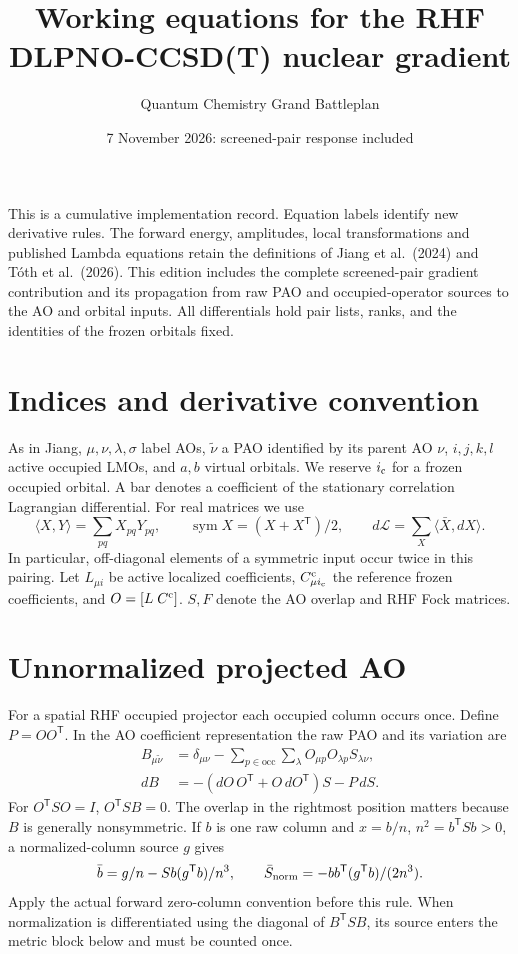 \documentclass[11pt]{article}
\title{Working equations for the RHF DLPNO-CCSD(T) nuclear gradient}
\author{Quantum Chemistry Grand Battleplan}
\date{7 November 2026: screened-pair response included}
\newcommand{\T}{^{\mathsf T}}
\newcommand{\sym}{\operatorname{sym}}
\newcommand{\ip}[2]{\langle #1,#2\rangle}
\begin{document}
\maketitle
This is a cumulative implementation record. Equation labels identify new
derivative rules. The forward energy, amplitudes, local transformations and
published Lambda equations retain the definitions of Jiang et al.\ (2024)
and T\'oth et al.\ (2026). This edition includes the complete screened-pair gradient contribution
and its propagation from raw PAO and occupied-operator sources to the
AO and orbital inputs. All differentials
hold pair lists, ranks, and the identities of the frozen orbitals fixed.
\section{Indices and derivative convention}
As in Jiang, $\mu,\nu,\lambda,\sigma$ label AOs, $\tilde\nu$ a PAO
identified by its parent AO $\nu$, $i,j,k,l$ active occupied LMOs, and $a,b$
virtual orbitals. We reserve $i_{\rm c}$ for a frozen occupied orbital.
A bar denotes a coefficient of the stationary correlation Lagrangian
differential. For real matrices we use
\begin{equation}\label{eq:pairing}
 \ip{X}{Y}=\sum_{pq}X_{pq}Y_{pq},\qquad
 \sym X=(X+X\T)/2,\qquad d\mathcal L=\sum_X\ip{\bar X}{dX}.
\end{equation}
In particular, off-diagonal elements of a symmetric input occur twice in
this pairing. Let $L_{\mu i}$ be active localized coefficients, $C^{\rm c}_{\mu i_{\rm c}}$
the reference frozen coefficients, and $O=[L\;C^{\rm c}]$. $S,F$ denote
the AO overlap and RHF Fock matrices.
\section{Unnormalized projected AO}
For a spatial RHF occupied projector each occupied column occurs once.
Define $P=OO\T$. In the AO coefficient representation the raw PAO and its
variation are
\begin{align}
 B_{\mu\tilde\nu}
 &=\delta_{\mu\nu}-\sum_{p\in\mathrm{occ}}\sum_\lambda
 O_{\mu p}O_{\lambda p}S_{\lambda\nu},\label{eq:raw}\\
 dB&=-(dO\,O\T+O\,dO\T)S-P\,dS.\label{eq:db}
\end{align}
For $O\T S O=I$, $O\T S B=0$. The overlap in the rightmost position
matters because $B$ is generally nonsymmetric. If $b$ is one raw column
and $x=b/n$, $n^2=b\T S b>0$, a normalized-column source $g$ gives
\begin{equation}\label{eq:normal}
 \bar b=g/n-Sb(g\T b)/n^3,\qquad
 \bar S_{\rm norm}=-bb\T(g\T b)/(2n^3).
\end{equation}
Apply the actual forward zero-column convention before this rule.
When normalization is differentiated using the diagonal of $B\T S B$,
its source enters the metric block below and must be counted once.
\end{document}
